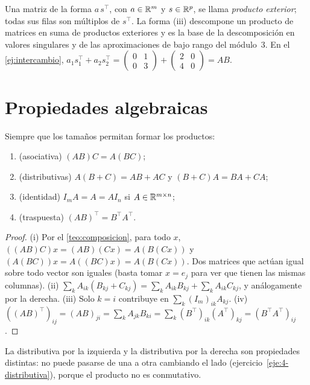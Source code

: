 Una matriz de la forma $a\,s^{\top}$, con $a\in\mathbb{R}^{m}$ y $s\in\mathbb{R}^{p}$, se llama \emph{producto exterior}; todas sus filas son múltiplos de $s^{\top}$. La forma (iii) descompone un producto de matrices en suma de productos exteriores y es la base de la descomposición en valores singulares y de las aproximaciones de bajo rango del módulo~3. En el \cref{ej:intercambio}, $a_1s_1^{\top}+a_2s_2^{\top}=\begin{pmatrix}0&1\\0&3\end{pmatrix}+\begin{pmatrix}2&0\\4&0\end{pmatrix}=AB$.

\section{Propiedades algebraicas}

\begin{proposicion}\label{prop:algebra}
Siempre que los tamaños permitan formar los productos:
\begin{enumerate}
  \item (asociativa) $(AB)C=A(BC)$;
  \item (distributivas) $A(B+C)=AB+AC$ y $(B+C)A=BA+CA$;
  \item (identidad) $I_mA=A=AI_n$ si $A\in\mathbb{R}^{m\times n}$;
  \item (traspuesta) $(AB)^{\top}=B^{\top}A^{\top}$.
\end{enumerate}
\end{proposicion}

\begin{proof}
(i) Por el \cref{teo:composicion}, para todo $x$, $((AB)C)x=(AB)(Cx)=A(B(Cx))$ y $(A(BC))x=A((BC)x)=A(B(Cx))$. Dos matrices que actúan igual sobre todo vector son iguales (basta tomar $x=e_j$ para ver que tienen las mismas columnas). (ii) $\sum_kA_{ik}(B_{kj}+C_{kj})=\sum_kA_{ik}B_{kj}+\sum_kA_{ik}C_{kj}$, y análogamente por la derecha. (iii) Solo $k=i$ contribuye en $\sum_k(I_m)_{ik}A_{kj}$. (iv) $((AB)^{\top})_{ij}=(AB)_{ji}=\sum_kA_{jk}B_{ki}=\sum_k(B^{\top})_{ik}(A^{\top})_{kj}=(B^{\top}A^{\top})_{ij}$.
\end{proof}

La distributiva por la izquierda y la distributiva por la derecha son propiedades distintas: no puede pasarse de una a otra cambiando el lado (ejercicio~\ref{eje:4-distributiva}), porque el producto no es conmutativo.

